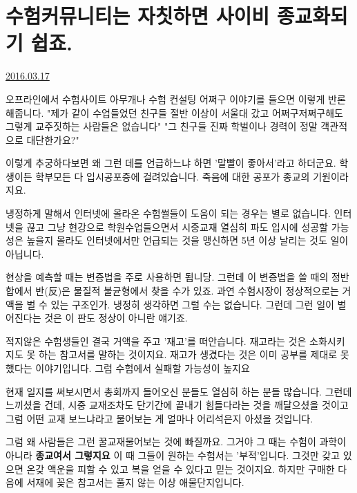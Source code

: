 \section{수험커뮤니티는 자칫하면 사이비 종교화되기 쉽죠.}
\href{https://www.kockoc.com/Apoc/680137}{2016.03.17}

\vspace{5mm}

오프라인에서 수험사이트 아무개나 수험 컨설팅 어쩌구 이야기를 들으면 이렇게 반론해줍니다.
"제가 같이 수업들었던 친구들 절반 이상이 서울대 갔고 어쩌구저쩌구해도 그렇게 교주짓하는 사람들은 없습니다"
"그 친구들 진짜 학벌이나 경력이 정말 객관적으로 대단한가요?"
\vspace{5mm}

이렇게 추궁하다보면 왜 그런 데를 언급하느냐 하면 '말빨이 좋아서'라고 하더군요.
학생이든 학부모든 다 입시공포증에 걸려있습니다. 죽음에 대한 공포가 종교의 기원이라지요.
\vspace{5mm}

냉정하게 말해서 인터넷에 올라온 수험썰들이 도움이 되는 경우는 별로 없습니다.
인터넷을 끊고 그냥 현강으로 학원수업들으면서 시중교재 열심히 파도 입시에 성공할 가능성은 높을지 몰라도
인터넷에서만 언급되는 것을 맹신하면 5년 이상 날리는 것도 일이 아닙니다.
\vspace{5mm}

현상을 예측할 때는 변증법을 주로 사용하면 됩니당.
그런데 이 변증법을 쓸 때의 정반합에서 반(反)은 물질적 불균형에서 찾을 수가 있죠.
과연 수험시장이 정상적으로는 거액을 벌 수 있는 구조인가.
냉정히 생각하면 그럴 수는 없습니다. 그런데 그런 일이 벌어진다는 것은 이 판도 정상이 아니란 얘기죠.
\vspace{5mm}

적지않은 수험생들인 결국 거액을 주고 '재고'를 떠안습니다.
재고라는 것은 소화시키지도 못 하는 참고서를 말하는 것이지요.
재고가 생겼다는 것은 이미 공부를 제대로 못 했다는 이야기입니다. 그럼 수험에서 실패할 가능성이 높지요
\vspace{5mm}

현재 일지를 써보시면서 총회까지 들어오신 분들도 열심히 하는 분들 많습니다.
그런데 느끼셨을 건데, 시중 교재조차도 단기간에 끝내기 힘들다라는 것을 깨달으셨을 것이고
그럼 어떤 교재 보느냐라고 물어보는 게 얼마나 어리석은지 아셨을 것입니다.
\vspace{5mm}

그럼 왜 사람들은 그런 꿀교재물어보는 것에 빠질까요. 그거야 그 때는 수험이 과학이 아니라 \textbf{종교여서 그렇지요}
이 때 그들이 원하는 수험서는 '부적'입니다. 그것만 갖고 있으면 온갖 액운을 피할 수 있고 복을 얻을 수 있다고 믿는 것이지요.
하지만 구매한 다음에 서재에 꽂은 참고서는 풀지 않는 이상 애물단지입니다.
\vspace{5mm}

